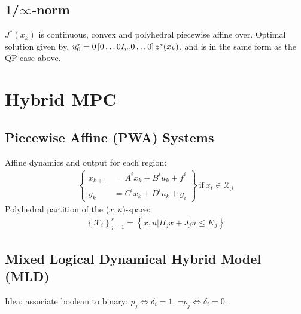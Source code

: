\documentclass[landscape,a4paper,8pt]{scrartcl}
\newcommand{\mc}[1]{\mathcal{#1}}
\newcommand{\Mg}[1]{\begin{Bmatrix}#1\end{Bmatrix}} %
\begin{document}
\begin{multicols*}{3}
\subsection{1/$\infty$-norm}
$J^*(x_k)$ is continuous, convex and polyhedral piecewise affine over. 
Optimal solution given by, $u^*_0 = 0 \left[0\space \dots 0\space I_m\space 0\space \dots 0\space \right]z^*(x_k)$, and is in the same form as the QP case above.
\section{Hybrid MPC}
\subsection{Piecewise Affine (PWA) Systems}
Affine dynamics and output for each region:
\begin{align*}
\Mg{x_{k+1} &= A^i x_k + B^i u_k + f^i \\ y_k &= C^i x_k + D^i u_k + g_i} \mathrm{~if~} x_t \in \mc{X}_j
\end{align*}
Polyhedral partition of the ($x,u$)-space:
\begin{align*}
\left\{\mc{X}_i\right\}_{j=1}^s = \left\{x,u| H_j x + J_j u \leq K_j\right\}
\end{align*}

\subsection{Mixed Logical Dynamical Hybrid Model (MLD)}
Idea: associate boolean to binary: $ p_j \iff \delta_i = 1$, $\neg p_j \iff \delta_i =0$.

\end{multicols*}
\end{document}
